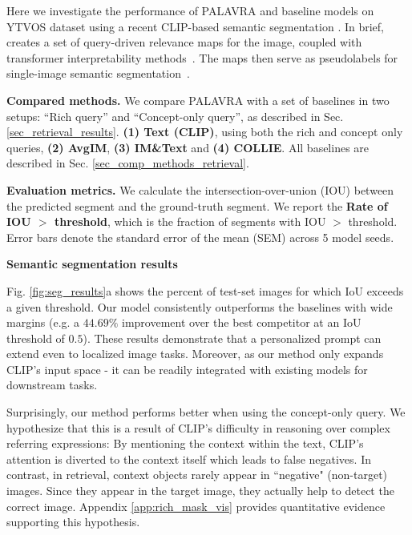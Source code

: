\documentclass[runningheads]{llncs}
\newcommand{\secref}[1]{Sec. \ref{#1}}
\newcommand\edit[1]{#1}
\begin{document}
Here we investigate the performance of PALAVRA and baseline models on YTVOS dataset using a recent CLIP-based semantic segmentation  \cite{zabari2021semantic}. In brief,  \cite{zabari2021semantic} creates a set of query-driven relevance maps for the image, coupled with transformer interpretability methods~\cite{Chefer_2021_CVPR}.  The maps then serve as pseudolabels for single-image semantic segmentation~\cite{reviving2021}.
 
\noindent\textbf{Compared methods.}
\label{sec_comp_methods_sseg}
We compare PALAVRA with a set of baselines in two setups: ``Rich query'' and ``Concept-only query'', as described in  \secref{sec_retrieval_results}. 
\textbf{(1) Text (CLIP)}, using both the rich and concept only queries, \textbf{(2) AvgIM}, \textbf{(3) IM\&Text} and \textbf{ (4) COLLIE}. All baselines are described in \secref{sec_comp_methods_retrieval}. 

\noindent\textbf{Evaluation metrics.}
We calculate the intersection-over-union (IOU) between the predicted segment and the ground-truth segment. We report the \textbf{Rate of IOU $>$ threshold}, which is the fraction of segments with IOU $>$ threshold. Error bars denote the standard error of the mean (SEM) across 5 model seeds.



\noindent\textbf{Semantic segmentation results}

Fig. \ref{fig:seg_results}a shows the percent of test-set images for which IoU exceeds a given threshold. Our model consistently outperforms the baselines with wide margins (e.g. a $44.69\%$ improvement over the best competitor at an IoU threshold of $0.5$).
These results demonstrate that a personalized prompt can extend even to localized image tasks. Moreover, as our method only expands CLIP's input space - it can be readily integrated with existing models for downstream tasks. 

Surprisingly, our method performs better when using the concept-only query. We hypothesize that this is a result of CLIP's difficulty in reasoning over complex referring expressions: By mentioning the context within the text, CLIP's attention is diverted to the context itself which leads to false negatives.  
\edit{In contrast, in retrieval, context  objects rarely appear in ``negative" (non-target) images. Since they appear in the target image, they actually help to detect the correct image. Appendix \ref{app:rich_mask_vis} provides quantitative evidence supporting this hypothesis.}
\end{document}
